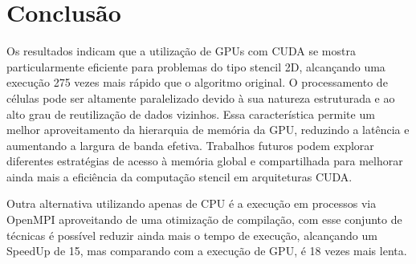 \pagebreak


\section{Conclusão}

Os resultados indicam que a utilização de GPUs com CUDA se mostra particularmente eficiente para problemas do tipo stencil 2D, alcançando uma execução 275 vezes mais rápido que o algoritmo original. O processamento de células pode ser altamente paralelizado devido à sua natureza estruturada e ao alto grau de reutilização de dados vizinhos. Essa característica permite um melhor aproveitamento da hierarquia de memória da GPU, reduzindo a latência e aumentando a largura de banda efetiva. Trabalhos futuros podem explorar diferentes estratégias de acesso à memória global e compartilhada para melhorar ainda mais a eficiência da computação stencil em arquiteturas CUDA.

Outra alternativa utilizando apenas de CPU é a execução em processos via OpenMPI aproveitando de uma otimização de compilação, com esse conjunto de técnicas é possível reduzir ainda mais o tempo de execução, alcançando um SpeedUp de 15, mas comparando com a execução de GPU, é 18 vezes mais lenta.